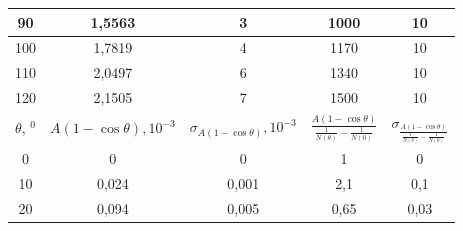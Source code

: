 \documentclass[a4paper, 12pt]{article}%
\begin{document}
\begin{table}[h!]
\begin{center}
\begin{tabular}{|c|c|c|c|c|}
90             & 1,5563                                          & 3                                                                      & 1000                                                            & 10                                                                       \\ \hline
100            & 1,7819                                          & 4                                                                      & 1170                                                            & 10                                                                       \\ \hline
110            & 2,0497                                          & 6                                                                      & 1340                                                            & 10                                                                       \\ \hline
120            & 2,1505                                          & 7                                                                      & 1500                                                            & 10                                                                       \\ \hline
$\theta$, $^0$ & $A(1-\cos \theta), 10^{-3}$                     & $\sigma_{A(1-\cos \theta)}, 10^{-3}$                                   & $\frac{A(1-\cos \theta)}{\frac{1}{N(\theta)} - \frac{1}{N(0)}}$ & $\sigma_{\frac{A(1-\cos \theta)}{\frac{1}{N(\theta)} - \frac{1}{N(0)}}}$ \\ \hline
0              & 0                                               & 0                                                                      & 1                                                               & 0                                                                        \\ \hline
10             & 0,024                                           & 0,001                                                                  & 2,1                                                             & 0,1                                                                      \\ \hline
20             & 0,094                                           & 0,005                                                                  & 0,65                                                            & 0,03                                                                     \\ \hline

\end{tabular}
\end{center}
\end{table}
\end{document}
